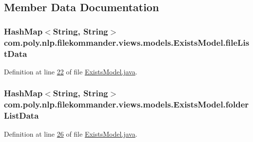 \subsection{Member Data Documentation}
\hypertarget{classcom_1_1poly_1_1nlp_1_1filekommander_1_1views_1_1models_1_1_exists_model_a72865eacbf48e01130d4ab3cf9d1d937}{
\subsubsection[{file\-List\-Data}]{\setlength{\rightskip}{0pt plus 5cm}Hash\-Map$<$String, String$>$ com.\-poly.\-nlp.\-filekommander.\-views.\-models.\-Exists\-Model.\-file\-List\-Data\hspace{0.3cm}{\ttfamily [private]}}}\label{classcom_1_1poly_1_1nlp_1_1filekommander_1_1views_1_1models_1_1_exists_model_a72865eacbf48e01130d4ab3cf9d1d937}


Definition at line \hyperlink{L22}{22} of file \hyperlink{}{Exists\-Model.\-java}.

\hypertarget{classcom_1_1poly_1_1nlp_1_1filekommander_1_1views_1_1models_1_1_exists_model_ad61aa992f579cc10034c3f4343e80a79}{
\subsubsection[{folder\-List\-Data}]{\setlength{\rightskip}{0pt plus 5cm}Hash\-Map$<$String, String$>$ com.\-poly.\-nlp.\-filekommander.\-views.\-models.\-Exists\-Model.\-folder\-List\-Data\hspace{0.3cm}{\ttfamily [private]}}}\label{classcom_1_1poly_1_1nlp_1_1filekommander_1_1views_1_1models_1_1_exists_model_ad61aa992f579cc10034c3f4343e80a79}


Definition at line \hyperlink{L26}{26} of file \hyperlink{}{Exists\-Model.\-java}.

